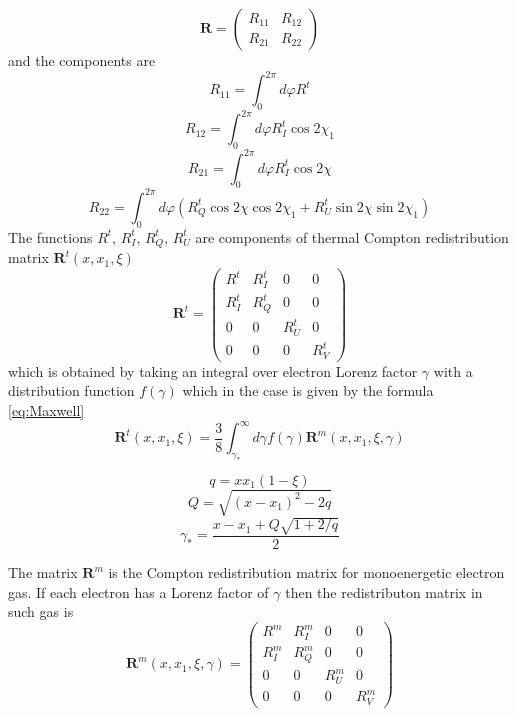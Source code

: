 \documentclass[iop, usenatbib]{emulateapj}
\newcommand{\be}{\begin{equation}}
\newcommand{\ee}{\end{equation}}
\begin{document}
\be
\bm{R}=
\left( {\begin{array}{cc}
    R_{11} & R_{12}  \\
    R_{21} & R_{22}  
    \end{array} } \right)
\ee
and the components are
$$
R_{11}=\int_0^{2\pi} d\varphi R^t 
$$$$
R_{12}=\int_0^{2\pi} d\varphi R^t_I\cos2\chi_1 
$$$$
R_{21}=\int_0^{2\pi} d\varphi R^t_I\cos2\chi 
$$$$
R_{22}=\int_0^{2\pi} d\varphi (R^t_Q\cos2\chi\cos2\chi_1 + R^t_U \sin2\chi\sin2\chi_1)
$$
The functions $R^t,\,R^t_I,\,R^t_Q,\,R^t_U$ are components of thermal Compton redistribution matrix $\bm{R}^t(x,x_1,\xi)$ 
\be
\bm{R}^t= 
\left( {\begin{array}{cccc}
    R^t & R^t_I & 0 & 0 \\
     R^t_I &  R^t_Q & 0 & 0 \\
    0 & 0 &  R^t_U & 0 \\
    0 & 0 & 0 &  R^t_V  
   \end{array} } \right)
\ee
which is obtained by taking an integral over electron Lorenz factor $\gamma$ with a distribution function $f(\gamma)$ which
in the case is given by the formula \eqref{eq:Maxwell}
\be
\bm{R}^t(x,x_1,\xi)=\frac38\int_{\gamma_*}^\infty d\gamma
f(\gamma)\bm{R}^m(x,x_1,\xi,\gamma)
\ee

$$
q=xx_1(1-\xi)$$$$
Q=\sqrt{(x-x_1)^2-2q}
$$
\be
\gamma_*=\frac{x-x_1+Q\sqrt{1+2/q}}2
\ee

The matrix $\bm{R}^m$ is the Compton redistribution matrix for monoenergetic electron gas. If each electron has a Lorenz factor of $\gamma$ then the redistributon matrix in such gas is
\be
\bm{R}^m(x,x_1,\xi,\gamma)= 
\left( {\begin{array}{cccc}
    R^m & R^m_I & 0 & 0 \\
     R^m_I &  R^m_Q & 0 & 0 \\
    0 & 0 &  R^m_U & 0 \\
    0 & 0 & 0 &  R^m_V  
   \end{array} } \right)
\ee
\end{document}
